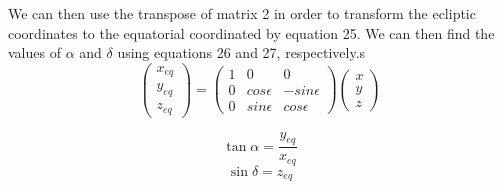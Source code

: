 \documentclass[letterpaper,12pt]{article}
\begin{document}
We can then use the transpose of matrix 2 in order to transform the ecliptic coordinates to the equatorial coordinated by equation 25. We can then find the values of \begin{math} \alpha \end{math} and \begin{math} \delta \end{math} using equations 26 and 27, respectively.s
\begin{equation}
\begin{pmatrix}
  x_{eq} \\
  y_{eq} \\
  z_{eq}
 \end{pmatrix} 
  =
\begin{pmatrix}
1 & 0 & 0 \\ 
 0 & cos\epsilon & -sin\epsilon\\ 
 0 & sin\epsilon & cos\epsilon
\end{pmatrix}
\begin{pmatrix}
  x \\
  y \\
  z
\end{pmatrix} 
\end{equation}



\begin{equation}
\tan \alpha= \frac{y_{eq}}{x_{eq}}
\end{equation}
\begin{equation}
\sin \delta= z_{eq}
\end{equation}


\end{document}
